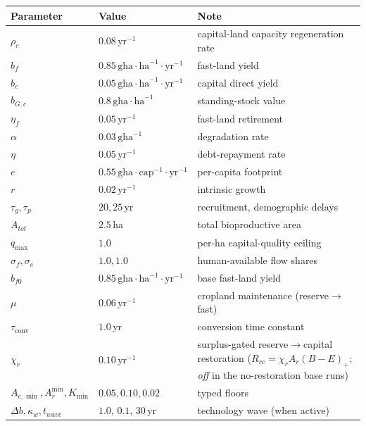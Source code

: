 \documentclass[11pt]{article}
\begin{document}
\begin{table}[htbp]
\centering
\small
\begin{tabularx}{\textwidth}{l>{\raggedright\arraybackslash}X>{\raggedright\arraybackslash}X}
\toprule
Parameter & Value & Note \\
\midrule
$\rho_c$ & $0.08\,\text{yr}^{-1}$ & capital-land capacity regeneration rate \\
$b_f$ & $0.85\,\text{gha}\cdot\text{ha}^{-1}\cdot\text{yr}^{-1}$ & fast-land yield \\
$b_c$ & $0.05\,\text{gha}\cdot\text{ha}^{-1}\cdot\text{yr}^{-1}$ & capital direct yield \\
$b_{G,c}$ & $0.8\,\text{gha}\cdot\text{ha}^{-1}$ & standing-stock value \\
$\eta_f$ & $0.05\,\text{yr}^{-1}$ & fast-land retirement \\
$\alpha$ & $0.03\,\text{gha}^{-1}$ & degradation rate \\
$\eta$ & $0.05\,\text{yr}^{-1}$ & debt-repayment rate \\
$e$ & $0.55\,\text{gha}\cdot\text{cap}^{-1}\cdot\text{yr}^{-1}$ & per-capita footprint \\
$r$ & $0.02\,\text{yr}^{-1}$ & intrinsic growth \\
$\tau_g,\tau_p$ & $20,25$\,yr & recruitment, demographic delays \\
$A_{tot}$ & $2.5$\,ha & total bioproductive area \\
$q_{\max}$ & $1.0$ & per-ha capital-quality ceiling \\
$\sigma_f,\sigma_c$ & $1.0,1.0$ & human-available flow shares \\
$b_{f0}$ & $0.85\,\text{gha}\cdot\text{ha}^{-1}\cdot\text{yr}^{-1}$ & base fast-land yield \\
$\mu$ & $0.06\,\text{yr}^{-1}$ & cropland maintenance (reserve$\to$fast) \\
$\tau_{\mathrm{conv}}$ & $1.0$\,yr & conversion time constant \\
$\chi_r$ & $0.10\,\text{yr}^{-1}$ & surplus-gated reserve$\to$capital restoration ($R_{rc}=\chi_r A_r(B-E)_+$; \emph{off} in the no-restoration base runs) \\
$A_{c,\min},A_r^{\min},K_{\min}$ & $0.05,0.10,0.02$ & typed floors \\
$\Delta b,\kappa_w,t_{wave}$ & $1.0,\,0.1,\,30$\,yr & technology wave (when active) \\
\bottomrule
\end{tabularx}
\end{table}
\end{document}
